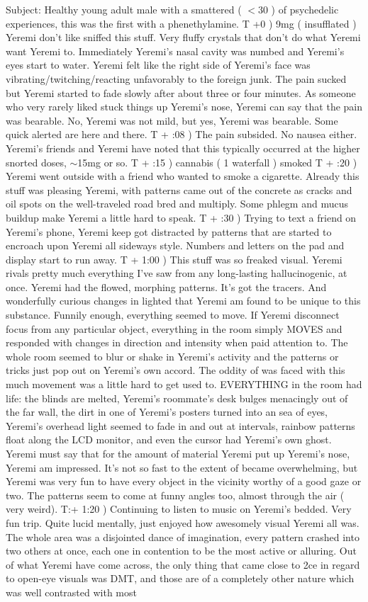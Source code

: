 \documentclass[12pt]{book}
\begin{document}
Subject: Healthy young adult male with a smattered ( $<$30 ) of psychedelic experiences, this was the first with a phenethylamine. T +0 ) 9mg ( insufflated ) Yeremi don't like sniffed this stuff. Very fluffy crystals that don't do what Yeremi want Yeremi to. Immediately Yeremi's nasal cavity was numbed and Yeremi's eyes start to water. Yeremi felt like the right side of Yeremi's face was vibrating/twitching/reacting unfavorably to the foreign junk. The pain sucked but Yeremi started to fade slowly after about three or four minutes. As someone who very rarely liked stuck things up Yeremi's nose, Yeremi can say that the pain was bearable. No, Yeremi was not mild, but yes, Yeremi was bearable. Some quick alerted are here and there. T + :08 ) The pain subsided. No nausea either. Yeremi's friends and Yeremi have noted that this typically occurred at the higher snorted doses, $\sim$15mg or so. T + :15 ) cannabis ( 1 waterfall ) smoked T + :20 ) Yeremi went outside with a friend who wanted to smoke a cigarette. Already this stuff was pleasing Yeremi, with patterns came out of the concrete as cracks and oil spots on the well-traveled road bred and multiply. Some phlegm and mucus buildup make Yeremi a little hard to speak. T + :30 ) Trying to text a friend on Yeremi's phone, Yeremi keep got distracted by patterns that are started to encroach upon Yeremi all sideways style. Numbers and letters on the pad and display start to run away. T + 1:00 ) This stuff was so freaked visual. Yeremi rivals pretty much everything I've saw from any long-lasting hallucinogenic, at once. Yeremi had the flowed, morphing patterns. It's got the tracers. And wonderfully curious changes in lighted that Yeremi am found to be unique to this substance. Funnily enough, everything seemed to move. If Yeremi disconnect focus from any particular object, everything in the room simply MOVES and responded with changes in direction and intensity when paid attention to. The whole room seemed to blur or shake in Yeremi's activity and the patterns or tricks just pop out on Yeremi's own accord. The oddity of was faced with this much movement was a little hard to get used to. EVERYTHING in the room had life: the blinds are melted, Yeremi's roommate's desk bulges menacingly out of the far wall, the dirt in one of Yeremi's posters turned into an sea of eyes, Yeremi's overhead light seemed to fade in and out at intervals, rainbow patterns float along the LCD monitor, and even the cursor had Yeremi's own ghost. Yeremi must say that for the amount of material Yeremi put up Yeremi's nose, Yeremi am impressed. It's not so fast to the extent of became overwhelming, but Yeremi was very fun to have every object in the vicinity worthy of a good gaze or two. The patterns seem to come at funny angles too, almost through the air ( very weird). T:+ 1:20 ) Continuing to listen to music on Yeremi's bedded. Very fun trip. Quite lucid mentally, just enjoyed how awesomely visual Yeremi all was. The whole area was a disjointed dance of imagination, every pattern crashed into two others at once, each one in contention to be the most active or alluring. Out of what Yeremi have come across, the only thing that came close to 2ce in regard to open-eye visuals was DMT, and those are of a completely other nature which was well contrasted with most 
\end{document}
